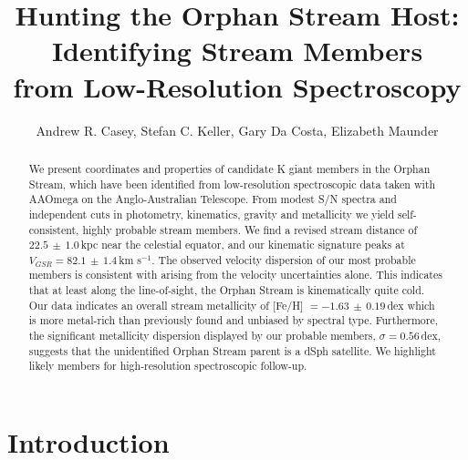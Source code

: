\documentclass[10pt,apjl]{emulateapj}
\begin{document}


\title{Hunting the Orphan Stream Host: Identifying Stream Members \\ from Low-Resolution Spectroscopy}

\author{Andrew R. Casey, Stefan C. Keller, Gary Da Costa, Elizabeth Maunder}

\begin{abstract}
We present coordinates and properties of candidate K giant members in the Orphan Stream, which have been identified from low-resolution spectroscopic data taken with AAOmega on the Anglo-Australian Telescope. From modest S/N spectra and independent cuts in photometry, kinematics, gravity and metallicity we yield self-consistent, highly probable stream members. We find a revised stream distance of $22.5\,\pm\,1.0$\,kpc near the celestial equator, and our kinematic signature peaks at $V_{GSR} = 82.1\,\pm\,1.4$\,km s$^{-1}$. The observed velocity dispersion of our most probable members is consistent with arising from the velocity uncertainties alone. This indicates that at least along the line-of-sight, the Orphan Stream is kinematically quite cold. Our data indicates an overall stream metallicity of [Fe/H] $= -1.63\,\pm\,0.19$\,dex which is more metal-rich than previously found and unbiased by spectral type. Furthermore, the significant metallicity dispersion displayed by our probable members, $\sigma = 0.56$\,dex, suggests that the unidentified Orphan Stream parent is a dSph satellite. We highlight likely members for high-resolution spectroscopic follow-up.
\end{abstract}


\section{Introduction}
\label{sec:introduction}
\end{document}
